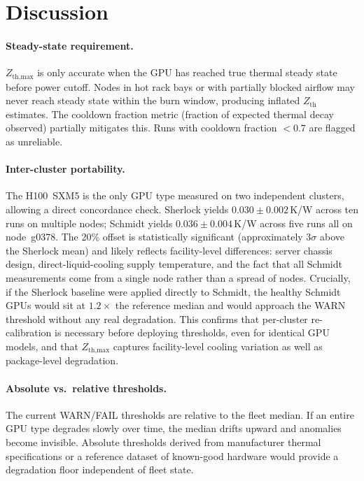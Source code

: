 \documentclass[conference]{IEEEtran}
\begin{document}
\section{Discussion}
\label{sec:discussion}

\paragraph{Steady-state requirement.}
$Z_\text{th,max}$ is only accurate when the GPU has reached true
thermal steady state before power cutoff.
Nodes in hot rack bays or with partially blocked airflow may never
reach steady state within the burn window, producing inflated
$Z_\text{th}$ estimates.
The cooldown fraction metric (fraction of expected thermal decay
observed) partially mitigates this. Runs with cooldown fraction
$< 0.7$ are flagged as unreliable.

\paragraph{Inter-cluster portability.}
The H100~SXM5 is the only GPU type measured on two independent
clusters, allowing a direct concordance check.
Sherlock yields $0.030 \pm 0.002$\,K/W across ten runs on multiple
nodes; Schmidt yields $0.036 \pm 0.004$\,K/W across five runs all on
node~g0378.
The 20\% offset is statistically significant (approximately 3$\sigma$
above the Sherlock mean) and likely reflects facility-level
differences: server chassis design, direct-liquid-cooling supply
temperature, and the fact that all Schmidt measurements come from a
single node rather than a spread of nodes.
Crucially, if the Sherlock baseline were applied directly to Schmidt,
the healthy Schmidt GPUs would sit at $1.2\times$ the reference
median and would approach the WARN threshold without any real
degradation.
This confirms that per-cluster re-calibration is necessary before
deploying thresholds, even for identical GPU models, and that
$Z_\text{th,max}$ captures facility-level cooling variation as well
as package-level degradation.

\paragraph{Absolute vs.\ relative thresholds.}
The current WARN/FAIL thresholds are relative to the fleet median.
If an entire GPU type degrades slowly over time, the median drifts
upward and anomalies become invisible.
Absolute thresholds derived from manufacturer thermal specifications
or a reference dataset of known-good hardware would provide a
degradation floor independent of fleet state.
\end{document}
